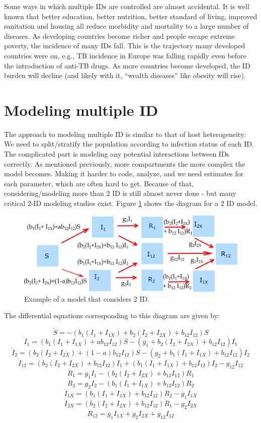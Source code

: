 \documentclass[]{book}
\theoremstyle{definition}
\theoremstyle{definition}
\theoremstyle{definition}
\theoremstyle{remark}
\begin{document}
Some ways in which multiple IDs are controlled are almost accidental. It
is well known that better education, better nutrition, better standard
of living, improved sanitation and housing all reduce morbidity and
mortality to a large number of diseases. As developing countries become
richer and people escape extreme poverty, the incidence of many IDs
fall. This is the trajectory many developed countries were on, e.g., TB
incidence in Europe was falling rapidly even before the introduction of
anti-TB drugs. As more countries become developed, the ID burden will
decline (and likely with it, ``wealth diseases'' like obesity will
rise).

\section{Modeling multiple ID}\label{myadvancedbox}

The approach to modeling multiple ID is similar to that of host
heterogeneity: We need to split/stratify the population according to
infection status of each ID. The complicated part is modeling any
potential interactions between IDs correctly. As mentioned previously,
more compartments the more complex the model becomes. Making it harder
to code, analyze, and we need estimates for each parameter, which are
often hard to get. Because of that, considering/modeling more than 2 ID
is still almost never done - but many critical 2-ID modeling studies
exist. Figure \ref{fig:coinfection} shows the diagram for a 2 ID model.

\begin{figure}
\centering
\includegraphics{./images/multipathogenmodel.png}
\caption{\label{fig:coinfection}Example of a model that considers 2 ID.}
\end{figure}

The differential equations corresponding to this diagram are given by:

\[\dot S =  -  (b_{1} (I_1+I_{1X}) + b_{2} (I_2+I_{2X}) + b_{12}I_{12}) S  \]
\[\dot I_1 =   (b_{1} (I_1+I_{1X}) + ab_{12} I_{12})S - (g_1  + b_{2} (I_2+I_{2X})  + b_{12}  I_{12}) I_1\]
\[\dot I_2 =   (b_{2} (I_2+I_{2X}) +  (1-a) b_{12} I_{12})S - (g_2 + b_{1}(I_1 + I_{1X}) + b_{12} I_{12}) I_2\]
\[\dot I_{12} = (b_{2} (I_2+I_{2X})  + b_{12}  I_{12}) I_1 + (b_{1}(I_1 + I_{1X}) + b_{12} I_{12}) I_2  - g_{12} I_{12}\]
\[\dot R_1 = g_1 I_1 - (b_2 (I_2 + I_{2X}) + b_{12}  I_{12}) R_1\]
\[\dot R_2 = g_2 I_2 - (b_1 (I_1 + I_{1X}) + b_{12}  I_{12}) R_2\]
\[\dot I_{1X} = (b_1 (I_1 + I_{1X}) + b_{12}  I_{12}) R_2 - g_{1} I_{1X}\]
\[\dot I_{2X} = (b_2 (I_2 + I_{2X}) + b_{12}  I_{12}) R_1 - g_{2} I_{2X}\]
\[\dot R_{12} = g_{1} I_{1X} + g_{2} I_{2X} + g_{12} I_{12} \]
\end{document}
